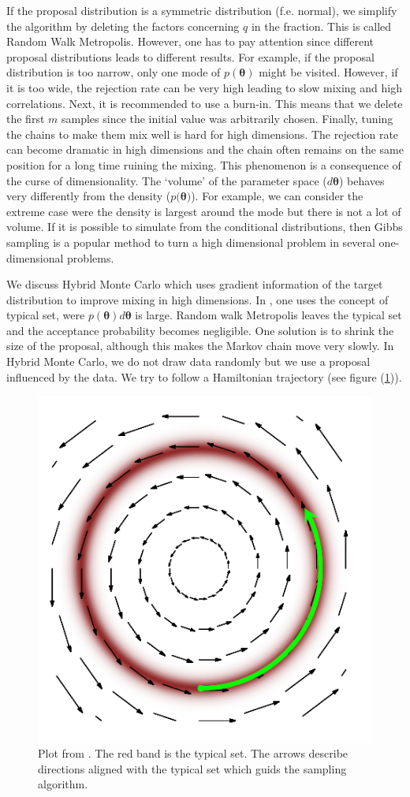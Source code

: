 \documentclass[12pt,a4paper,oneside]{book}
\begin{document}
If the proposal distribution is a symmetric distribution (f.e. normal), we simplify the algorithm by deleting the factors concerning $q$ in the fraction. This is called Random Walk Metropolis. However, one has to pay attention since different proposal distributions leads to different results. For example, if the proposal distribution is too narrow, only one mode of $p(\bm{\theta})$ might be visited. However, if it is too wide, the rejection rate can be very high leading to slow mixing and high correlations. Next, it is recommended to use a burn-in. This means that we delete the first $m$ samples since the initial value was arbitrarily chosen. Finally, tuning the chains to make them mix well is hard for high dimensions. The rejection rate can become dramatic in high dimensions and the chain often remains on the same position for a long time ruining the mixing. This phenomenon is a consequence of the curse of dimensionality. The `volume' of the parameter space ($d\bm{\theta}$) behaves very differently from the density ($p(\bm{\theta)}$). For example, we can consider the extreme case were the density is largest around the mode but there is not a lot of volume. If it is possible to simulate from the conditional distributions, then Gibbs sampling is a popular method to turn a high dimensional problem in several one-dimensional problems.

We discuss Hybrid Monte Carlo which uses gradient information of the target distribution to improve mixing in high dimensions. In \cite{betancourt2017conceptual}, one uses the concept of typical set, were $p(\bm{\theta}) d\bm{\theta}$ is large. Random walk Metropolis leaves the typical set and the acceptance probability becomes negligible. One solution is to shrink the size of the proposal, although this makes the Markov chain move very slowly. In Hybrid Monte Carlo, we do not draw data randomly but we use a proposal influenced by the data. We try to follow a Hamiltonian trajectory (see figure (\ref{fig:typ_set1.1})). 

\begin{figure}[!htb]
     \centering
     \includegraphics[width=0.4\linewidth]{plot_typical_Set}
     \caption{Plot from \cite{betancourt2017conceptual}. The red band is the typical set. The arrows describe directions aligned with the typical set which guids the sampling algorithm.}\label{fig:typ_set1.1}
\end{figure}
\end{document}
